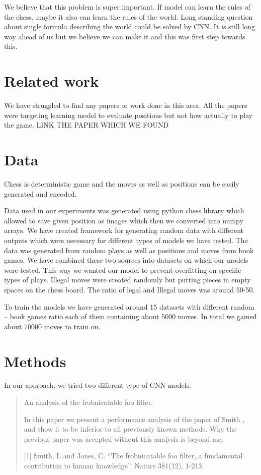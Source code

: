 \documentclass[10pt,twocolumn,letterpaper]{article}
\begin{document}
We believe that this problem is super important. If model can learn the rules of
the chess, maybe it also can learn the rules of the world. Long standing
question about single formula describing the world could be solved by CNN. It is
still long way ahead of us but we believe we can make it and this was first step
towards this.

\section{Related work}

We have struggled to find any papers or work done in this area. All the papers
were targeting learning model to evaluate positions but not how actually to play
the game. LINK THE PAPER WHICH WE FOUND

\section{Data}

Chess is deterministic game and the moves as well as positions can be easily
generated and encoded.

Data used in our experiments was generated using python chess library which
allowed to save given position as images which then we converted into numpy
arrays. We have created framework for generating random data with different
outputs which were necessary for different types of models we have tested. The
data was generated from random plays as well as positions and moves from book
games. We have combined these two sources into datasets on which our models were
tested. This way we wanted our model to prevent overfitting on specific types of
plays. Illegal moves were created randomly but putting pieces in empty spaces on
the chess board. The ratio of legal and Illegal moves was around 50-50.

To train the models we have generated around 15 datasets with different random
-- book games ratio each of them containing about 5000 moves. In total we gained
about 70000 moves to train on.

\section{Methods}

In our approach, we tried two different type of CNN models.

\begin{quote}
\begin{center}
     An analysis of the frobnicatable foo filter.
\end{center}

   In this paper we present a performance analysis of the paper of Smith \etal
   [1], and show it to be inferior to all previously known methods.  Why the
   previous paper was accepted without this analysis is beyond me.

   [1] Smith, L and Jones, C. ``The frobnicatable foo filter, a fundamental
   contribution to human knowledge''. Nature 381(12), 1-213.
\end{quote}
\end{document}
